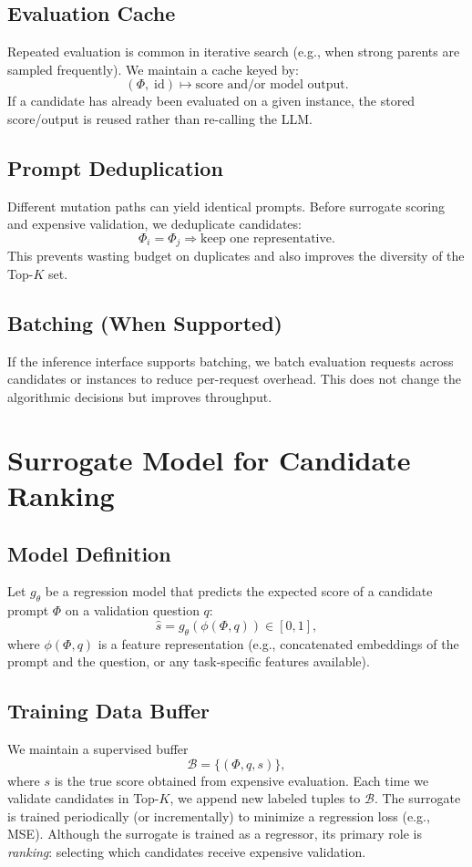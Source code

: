\subsection{Evaluation Cache}
Repeated evaluation is common in iterative search (e.g., when strong parents are sampled frequently). We maintain a cache keyed by:
\[
(\Phi,\; \text{id}) \mapsto \text{score and/or model output}.
\]
If a candidate has already been evaluated on a given instance, the stored score/output is reused rather than re-calling the LLM.

\subsection{Prompt Deduplication}
Different mutation paths can yield identical prompts. Before surrogate scoring and expensive validation, we deduplicate candidates:
\[
\Phi_i = \Phi_j \Rightarrow \text{keep one representative}.
\]
This prevents wasting budget on duplicates and also improves the diversity of the Top-$K$ set.

\subsection{Batching (When Supported)}
If the inference interface supports batching, we batch evaluation requests across candidates or instances to reduce per-request overhead. This does not change the algorithmic decisions but improves throughput.

\section{Surrogate Model for Candidate Ranking}
\subsection{Model Definition}
Let $g_\theta$ be a regression model that predicts the expected score of a candidate prompt $\Phi$ on a validation question $q$:
\[
\widehat{s} = g_\theta(\phi(\Phi,q)) \in [0,1],
\]
where $\phi(\Phi,q)$ is a feature representation (e.g., concatenated embeddings of the prompt and the question, or any task-specific features available).

\subsection{Training Data Buffer}
We maintain a supervised buffer
\[
\mathcal{B} = \{(\Phi, q, s)\},
\]
where $s$ is the true score obtained from expensive evaluation. Each time we validate candidates in Top-$K$, we append new labeled tuples to $\mathcal{B}$. The surrogate is trained periodically (or incrementally) to minimize a regression loss (e.g., MSE). Although the surrogate is trained as a regressor, its primary role is \emph{ranking}: selecting which candidates receive expensive validation.

